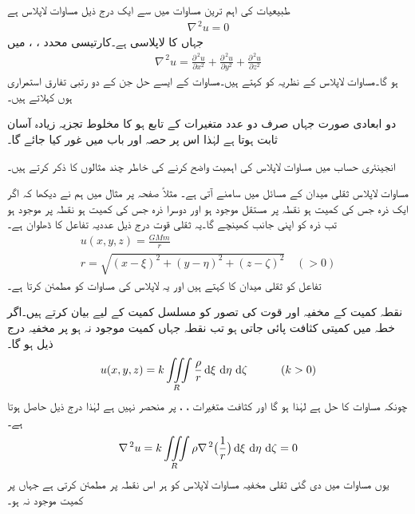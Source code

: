 طبیعیات کی اہم ترین مساوات میں سے ایک درج ذیل مساوات لاپلاس  ہے
\begin{align}\label{مساوات_جزوی_لاپلاس_الف}
\nabla^{\,2}u=0
\end{align}
جہاں  کا لاپلاسی    ہے۔کارتیسی محدد ، ،  میں
\begin{align}\label{مساوات_جزوی_لاپلاس_ب}
\nabla^{\,2}u=\frac{\partial^{\,2}u}{\partial x^2}+\frac{\partial^{\,2}u}{\partial y^2}+\frac{\partial^{\,2}u}{\partial z^2}
\end{align}
ہو گا۔مساوات لاپلاس کے نظریہ کو  کہتے ہیں۔مساوات  کے ایسے حل جن کے دو رتبی تفارق استمراری ہوں  کہلاتے ہیں۔

دو ابعادی صورت جہاں  صرف دو عدد متغیرات کے تابع ہو کا مخلوط تجزیہ زیادہ آسان ثابت ہوتا ہے لہٰذا اس پر حصہ  اور  باب  میں غور کیا جائے گا۔

انجینئری حساب میں مساوات لاپلاس کی اہمیت واضح کرنے کی خاطر چند مثالوں کا ذکر کرتے ہیں۔

مساوات لاپلاس ثقلی میدان کے مسائل میں سامنے آتی ہے۔  مثلاً صفحہ  پر مثال  میں ہم نے دیکھا کہ اگر ایک ذرہ  جس کی کمیت  ہو نقطہ  پر مستقل موجود ہو اور دوسرا ذرہ  جس کی کمیت  ہو نقطہ  پر موجود ہو تب  ذرہ  کو اپنی جانب کھینچے گا۔یہ ثقلی قوت درج ذیل عددیہ تفاعل  کا ڈھلوان ہے۔
\begin{align*}
u(x,y,z)=\frac{GMm}{r}\\
r=\sqrt{(x-\xi)^2+(y-\eta)^2+(z-\zeta)^2}\quad (>0)
\end{align*}
تفاعل  کو ثقلی میدان کا   کہتے ہیں اور یہ لاپلاس کی مساوات کو مطمئن کرتا ہے۔ 

نقطہ کمیت کے  مخفیہ اور قوت کی تصور کو مسلسل کمیت کے لیے بیان کرتے ہیں۔اگر خطہ  میں کمیتی کثافت  پائی جاتی ہو تب  نقطہ  جہاں کمیت موجود نہ ہو  پر مخفیہ  درج ذیل ہو گا۔ 
\begin{align}\label{مساوات_جزوی_لاپلاس_پ}
u(x,y,z)=k\iiint\limits_R \frac{\rho}{r}\dif \xi\,\dif \eta\,\dif \zeta\quad \quad \quad (k>0)
\end{align}
چونکہ  مساوات  کا حل ہے لہٰذا  ہو گا اور کثافت   متغیرات ، ،  پر منحصر نہیں ہے لہٰذا درج ذیل حاصل ہوتا ہے۔
\begin{align*}
\nabla^{\,2}u=k\iiint\limits_R \rho\nabla^{\,2}\big(\frac{1}{r}\big) \dif \xi\,\dif \eta\,\dif \zeta=0
\end{align*}
یوں مساوات  میں دی گئی ثقلی مخفیہ مساوات لاپلاس کو ہر اس نقطہ پر مطمئن کرتی ہے جہاں پر کمیت موجود نہ ہو۔

